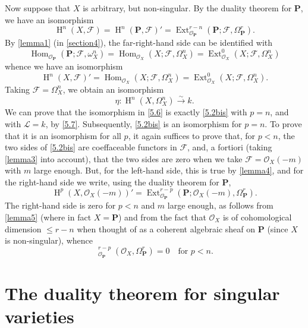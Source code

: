 \documentclass{article}
\theoremstyle{plain}
\theoremstyle{definition}
\newcommand{\sh}[1]{{\mathscr{#1}}}
\newcommand{\bb}{\mathbf}
\renewcommand{\leq}{\leqslant}
\DeclareMathOperator{\Ext}{Ext}
\DeclareMathOperator{\Hom}{Hom}
\DeclareMathOperator{\shExt}{\underline{Ext}}
\DeclareMathOperator{\HH}{H}
\newcommand{\oldpage}[1]{\marginpar{\footnotesize$\Big\vert$ \textit{p.~#1}}}
\begin{document}
Now suppose that $X$ is arbitrary, but non-singular.
By the duality theorem for $\bb{P}$, we have an isomorphism
\[
  \HH^n(X,\sh{F})
  = \HH^n(\bb{P},\sh{F})'
  = \Ext_{\sh{O}_\bb{P}}^{r-n}(\bb{P};\sh{F},\Omega_\bb{P}^r).
\]
By \cref{lemma1} (in \cref{section4}), the far-right-hand side can be identified with
\[
  \Hom_{\sh{O}_\bb{P}}(\bb{P};\sh{F},\omega_X^n)
  = \Hom_{\sh{O}_X}(X;\sh{F},\Omega_X^n)
  = \Ext_{\sh{O}_X}^0(X;\sh{F},\Omega_X^n)
\]
whence we have an isomorphism
\[
\label{5.6}
  \HH^n(X,\sh{F})'
  = \Hom_{\sh{O}_X}(X;\sh{F},\Omega_X^n)
  = \Ext_{\sh{O}_X}^0(X;\sh{F},\Omega_X^n).
\tag{5.6}
\]
Taking $\sh{F}=\Omega_X^n$, we obtain an isomorphism
\[
\label{5.7}
  \eta\colon \HH^n(X,\Omega_X^n) \xrightarrow{\sim} k.
\tag{5.7}
\]
\oldpage{149-17}
We can prove that the isomorphism in \cref{5.6} is exactly \cref{5.2bis} with $p=n$, and with $\sh{L}=k$, by \cref{5.7}.
Subsequently, \cref{5.2bis} is an isomorphism for $p=n$.
To prove that it is an isomorphism for all $p$, it again suffices to prove that, for $p<n$, the two sides of \cref{5.2bis} are coeffaceable functors in $\sh{F}$, and, a fortiori (taking \cref{lemma3} into account), that the two sides are zero when we take $\sh{F}=\sh{O}_X(-m)$ with $m$ large enough.
But, for the left-hand side, this is true by \cref{lemma4}, and for the right-hand side we write, using the duality theorem for $\bb{P}$,
\[
  \HH^p(X,\sh{O}_X(-m))'
  = \Ext_{\sh{O}_\bb{P}}^{r-p}(\bb{P};\sh{O}_X(-m),\Omega_\bb{P}^r).
\]
The right-hand side is zero for $p<n$ and $m$ large enough, as follows from \cref{lemma5} (where in fact $X=\bb{P}$) and from the fact that $\sh{O}_X$ is of cohomological dimension $\leq r-n$ when thought of as a coherent algebraic sheaf on $\bb{P}$ (since $X$ is non-singular), whence
\[
  \shExt_{\sh{O}_\bb{P}}^{r-p}(\sh{O}_X,\Omega_\bb{P}^r) = 0
  \quad\mbox{for $p<n$.}
\]


\section{The duality theorem for singular varieties}
\label{section6}
\end{document}
